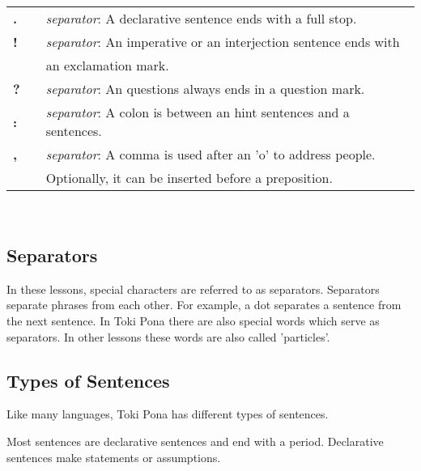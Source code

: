 \begin{supertabular}{p{2cm}|ll}
    \textbf{.} &  & \textit{separator}: A declarative sentence ends with a full stop.         \\ %
    \textbf{!} &  & \textit{separator}: An imperative or an interjection sentence ends with   \\ &&  an exclamation mark. \\ %
    \textbf{?} &  & \textit{separator}: An questions always ends in a question mark.          \\ %
    \textbf{:} &  & \textit{separator}: A colon is between an hint sentences and a sentences. \\  %
    \textbf{,} &  & \textit{separator}: A comma is used after an 'o' to address people.       \\ && Optionally, it can be inserted before a preposition. \\ %
\end{supertabular} \\

%
\subsection*{Separators}
%
In these lessons, special characters are referred to as separators.
Separators separate phrases from each other.
For example, a dot separates a sentence from the next sentence.
In Toki Pona there are also special words which serve as separators.
In other lessons these words are also called 'particles'.

%
\subsection*{Types of Sentences}
%
%
Like many languages, Toki Pona has different types of sentences.

Most sentences are declarative sentences and end with a period.
Declarative sentences make statements or assumptions.

